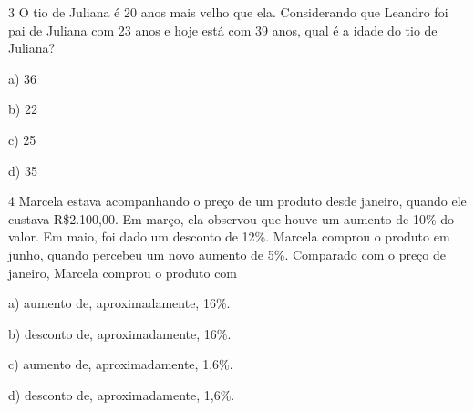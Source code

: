 \num{3} O tio de Juliana é 20 anos mais velho que ela. Considerando que
Leandro foi pai de Juliana com 23 anos e hoje está com 39 anos, qual é a
idade do tio de Juliana?

a) 36

b) 22

c) 25

d) 35



\num{4} Marcela estava acompanhando o preço de um produto desde janeiro,
quando ele custava R\$2.100,00. Em março, ela observou que houve um
aumento de 10\% do valor. Em maio, foi dado um desconto de 12\%. Marcela
comprou o produto em junho, quando percebeu um novo aumento de 5\%.
Comparado com o preço de janeiro, Marcela comprou o produto com

a) aumento de, aproximadamente, 16\%.

b) desconto de, aproximadamente, 16\%.

c) aumento de, aproximadamente, 1,6\%.

d) desconto de, aproximadamente, 1,6\%.



